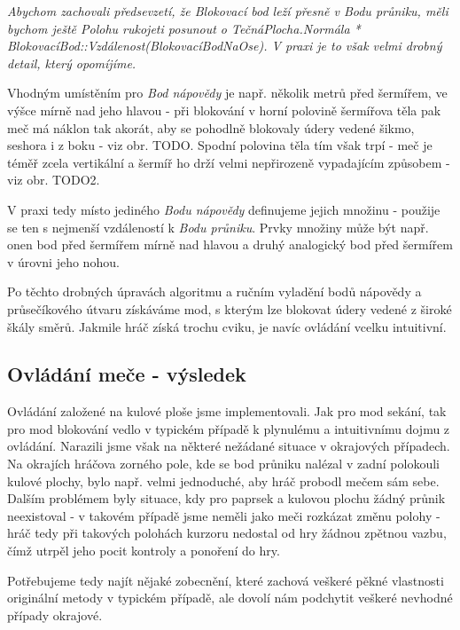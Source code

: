 \textit{Abychom zachovali předsevzetí, že \textit{Blokovací bod} leží přesně v \textit{Bodu průniku}, měli bychom ještě \textit{Polohu rukojeti} posunout o \textit{TečnáPlocha.Normála * BlokovacíBod::Vzdálenost(BlokovacíBodNaOse)}. V praxi je to však velmi drobný detail, který opomíjíme.}

Vhodným umístěním pro \textit{Bod nápovědy} je např. několik metrů před šermířem, ve výšce mírně nad jeho hlavou - při blokování v horní polovině šermířova těla pak meč má náklon tak akorát, aby se pohodlně blokovaly údery vedené šikmo, seshora i z boku - viz obr. TODO. Spodní polovina těla tím však trpí - meč je téměř zcela vertikální a šermíř ho drží velmi nepřirozeně vypadajícím způsobem - viz obr. TODO2. 
 
V praxi tedy místo jediného \textit{Bodu nápovědy} definujeme jejich množinu - použije se ten s nejmenší vzdáleností k \textit{Bodu průniku}. Prvky množiny může být např. onen bod před šermířem mírně nad hlavou a druhý analogický bod před šermířem v úrovni jeho nohou.  

\bigbreak

Po těchto drobných úpravách algoritmu a ručním vyladění bodů nápovědy a průsečíkového útvaru získáváme mod, s kterým lze blokovat údery vedené z široké škály směrů. Jakmile hráč získá trochu cviku, je navíc ovládání vcelku intuitivní.

\subsection{Ovládání meče - výsledek}

Ovládání založené na kulové ploše jsme implementovali. Jak pro mod sekání, tak pro mod blokování vedlo v typickém případě k plynulému a intuitivnímu dojmu z ovládání. Narazili jsme však na některé nežádané situace v okrajových případech. Na okrajích hráčova zorného pole, kde se bod průniku nalézal v zadní polokouli kulové plochy, bylo např. velmi jednoduché, aby hráč probodl mečem sám sebe. Dalším problémem byly situace, kdy pro paprsek a kulovou plochu žádný průnik neexistoval - v takovém případě jsme neměli jako meči rozkázat změnu polohy - hráč tedy při takových polohách kurzoru nedostal od hry žádnou zpětnou vazbu, čímž utrpěl jeho pocit kontroly a ponoření do hry.

Potřebujeme tedy najít nějaké zobecnění, které zachová veškeré pěkné vlastnosti originální metody v typickém případě, ale dovolí nám podchytit veškeré nevhodné případy okrajové.

